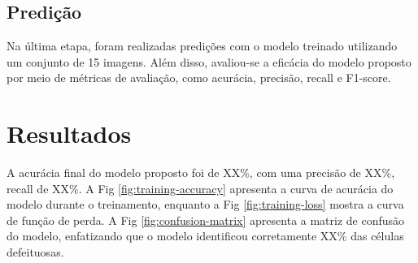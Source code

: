 \documentclass[conference]{IEEEtran}
\begin{document}
\subsection{Predição}\label{AA}

Na última etapa, foram realizadas predições com o modelo treinado utilizando
um conjunto de 15 imagens. Além disso, avaliou-se a eficácia do modelo proposto
por meio de métricas de avaliação, como acurácia, precisão, recall e F1-score.

\section{Resultados}

A acurácia final do modelo proposto foi de XX\%, com uma precisão de XX\%,
recall de
XX\%. A Fig \ref{fig:training-accuracy} apresenta a curva de acurácia do modelo
durante
o treinamento, enquanto a Fig \ref{fig:training-loss} mostra a curva de função
de perda.
A Fig \ref{fig:confusion-matrix} apresenta a matriz de confusão do modelo,
enfatizando que o modelo identificou corretamente XX\% das células defeituosas.
\end{document}
